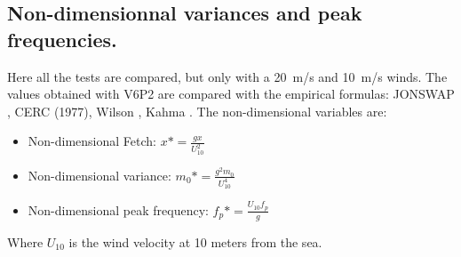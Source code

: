 \subsection{Non-dimensionnal variances and peak frequencies.}
Here all the tests are compared, but only with a 20~m/s and 10~m/s winds.
The values obtained with \tomawac V6P2 are compared with the empirical formulas:
JONSWAP \cite{Hasselmann1973}, CERC (1977)\cite {CERC77}, Wilson
\cite{Wilson1965}, Kahma \cite{Kahma1992}. The non-dimensional variables are:
\begin{itemize}
\item Non-dimensional Fetch: $x* = \frac{g x}{U_{10}^2}$
\item Non-dimensional variance: $m_{0}* = \frac{g^2 m_{0}}{U_{10}^4}$
\item Non-dimensional peak frequency: $f_{p}* = \frac{U_{10} f_{p}}{g}$
\end{itemize}
Where $U_{10}$ is the wind velocity at 10 meters from the sea.
